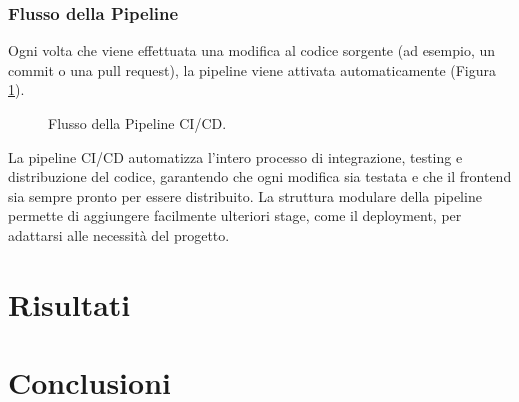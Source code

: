 \documentclass[twoside]{supsistudent}
\begin{document}
\subsection{Flusso della Pipeline}

Ogni volta che viene effettuata una modifica al codice sorgente (ad esempio, un commit o una pull request), la pipeline viene attivata automaticamente (Figura \ref{fig:pipeline}).

\begin{figure}[ht]
  \centering
  \caption{Flusso della Pipeline CI/CD.}
  \label{fig:pipeline}
\end{figure}



La pipeline CI/CD automatizza l'intero processo di integrazione, testing e distribuzione del codice, garantendo che ogni modifica sia testata e che il frontend sia sempre pronto per essere distribuito. La struttura modulare della pipeline permette di aggiungere facilmente ulteriori stage, come il deployment, per adattarsi alle necessità del progetto.


\chapter{Risultati}
\chapter{Conclusioni}


\cite{4538384}


\end{document}
